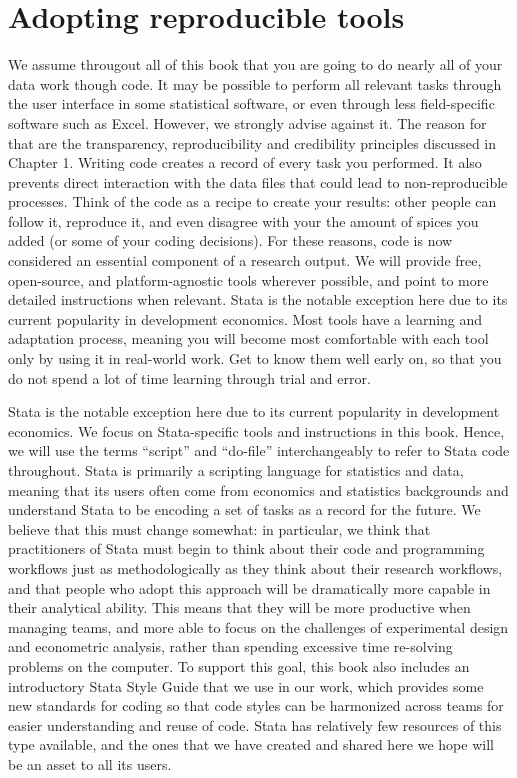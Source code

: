 \section{Adopting reproducible tools}

We assume througout all of this book
that you are going to do nearly all of your data work though code.
It may be possible to perform all relevant tasks
through the user interface in some statistical software,
or even through less field-specific software such as Excel.
However, we strongly advise against it.
The reason for that are the transparency, reproducibility and credibility principles
discussed in Chapter 1.
Writing code creates a record of every task you performed.
It also prevents direct interaction
with the data files that could lead to non-reproducible processes.
Think of the code as a recipe to create your results:
other people can follow it, reproduce it,
and even disagree with your the amount of spices you added
(or some of your coding decisions).
For these reasons, code is now considered an essential component of a research output.
We will provide free, open-source, and platform-agnostic tools wherever possible,
and point to more detailed instructions when relevant.
Stata is the notable exception here
due to its current popularity in development economics.
Most tools have a learning and adaptation process,
meaning you will become most comfortable with each tool
only by using it in real-world work.
Get to know them well early on,
so that you do not spend a lot of time learning through trial and error.

Stata is the notable exception here due to its current popularity in development economics.
We focus on Stata-specific tools and instructions in this book.
Hence, we will use the terms ``script'' and ``do-file''
interchangeably to refer to Stata code throughout.
Stata is primarily a scripting language for statistics and data,
meaning that its users often come from economics and statistics backgrounds
and understand Stata to be encoding a set of tasks as a record for the future.
We believe that this must change somewhat:
in particular, we think that practitioners of Stata
must begin to think about their code and programming workflows
just as methodologically as they think about their research workflows,
and that people who adopt this approach will be dramatically
more capable in their analytical ability.
This means that they will be more productive when managing teams,
and more able to focus on the challenges of experimental design
and econometric analysis, rather than spending excessive time
re-solving problems on the computer.
To support this goal, this book also includes
an introductory Stata Style Guide
that we use in our work, which provides
some new standards for coding so that code styles
can be harmonized across teams for easier understanding and reuse of code.
Stata has relatively few resources of this type available,
and the ones that we have created and shared here
we hope will be an asset to all its users.


